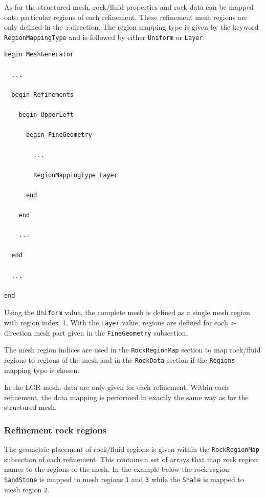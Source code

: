 As for the structured mesh, rock/fluid properties and rock data can be
mapped onto particular regions of each refinement. These refinement
mesh regions are only defined in the $z$-direction. The region mapping
type is given by the keyword \texttt{RegionMappingType} and is followed by
either \texttt{Uniform} or \texttt{Layer}:
%
\begin{verbatim}
begin MeshGenerator

  ... 

  begin Refinements

    begin UpperLeft

      begin FineGeometry
    
        ... 
    
        RegionMappingType Layer
    
      end

    end
    
    ... 

  end

  ... 

end
\end{verbatim}
%
Using the \texttt{Uniform} value, the complete mesh is defined as a
single mesh region with region index~1. With the \texttt{Layer} value,
regions are defined for each $z$-direction mesh part given in the
\texttt{FineGeometry} subsection. 

The mesh region indices are used in the \texttt{RockRegionMap} section
to map rock/fluid regions to regions of the mesh and in the
\texttt{RockData} section if the \texttt{Regions} mapping type is
chosen. 


\label{sec:lgr-data-mapping}

In the LGR-mesh, data are only given for each refinement. Within each
refinement, the data mapping is performed in exactly the same way as
for the structured mesh. 

\subsubsection{Refinement rock regions}
\label{sec:lgr-rock-regions}

The geometric placement of rock/fluid regions is given within the
\texttt{RockRegionMap} subsection of each refinement. This contains a
set of arrays that map rock region names to the regions of the mesh. 
In the example below the rock region \texttt{SandStone} is mapped to
mesh regions \texttt{1} and \texttt{3} while the \texttt{Shale} is
mapped to mesh region \texttt{2}. 

